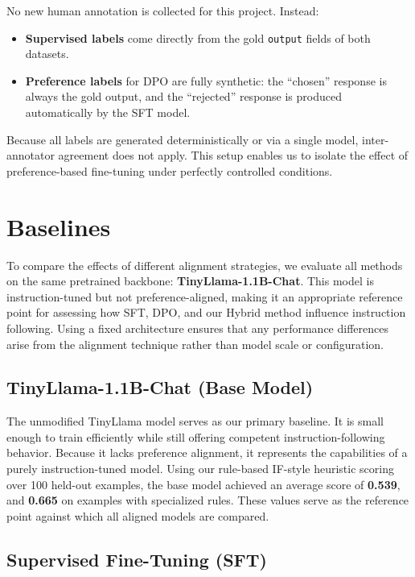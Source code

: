 \documentclass[11pt,a4paper]{article}
\begin{document}
No new human annotation is collected for this project.  
Instead:

\begin{itemize}
    \item \textbf{Supervised labels} come directly from the gold \texttt{output} fields of both datasets.
    \item \textbf{Preference labels} for DPO are fully synthetic: the ``chosen'' response is always the gold output, and the ``rejected'' response is produced automatically by the SFT model.
\end{itemize}

Because all labels are generated deterministically or via a single model, inter-annotator agreement does not apply. This setup enables us to isolate the effect of preference-based fine-tuning under perfectly controlled conditions.

\section{Baselines}

To compare the effects of different alignment strategies, we evaluate all methods on the same pretrained backbone: \textbf{TinyLlama-1.1B-Chat}. This model is instruction-tuned but not preference-aligned, making it an appropriate reference point for assessing how SFT, DPO, and our Hybrid method influence instruction following. Using a fixed architecture ensures that any performance differences arise from the alignment technique rather than model scale or configuration.

\subsection{TinyLlama-1.1B-Chat (Base Model)}

The unmodified TinyLlama model serves as our primary baseline. It is small enough to train efficiently while still offering competent instruction-following behavior. Because it lacks preference alignment, it represents the capabilities of a purely instruction-tuned model. Using our rule-based IF-style heuristic scoring over 100 held-out examples, the base model achieved an average score of \textbf{0.539}, and \textbf{0.665} on examples with specialized rules. These values serve as the reference point against which all aligned models are compared.

\subsection{Supervised Fine-Tuning (SFT)}
\end{document}
